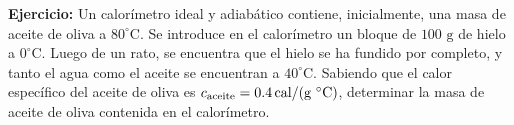 \documentclass[11pt, a4paper]{article}
\begin{document}
\noindent
\textbf{Ejercicio:} Un calorímetro ideal y adiabático contiene, inicialmente, una masa de aceite de oliva a $80^\circ\text{C}$. Se introduce en el calorímetro un bloque de $100\text{ g}$ de hielo a $0^\circ\text{C}$. Luego de un rato, se encuentra que el hielo se ha fundido por completo, y tanto el agua como el aceite se encuentran a $40^\circ\text{C}$. Sabiendo que el calor específico del aceite de oliva es $c_\text{aceite} = 0.4\textrm{\,cal/(g $^\circ$C)}$, determinar la masa de aceite de oliva contenida en el calorímetro.
\end{document}
